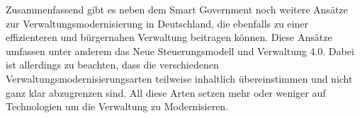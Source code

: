 Zusammenfassend gibt es neben dem Smart Government noch weitere Ansätze zur Verwaltungsmodernisierung in Deutschland, die ebenfalls zu einer effizienteren und bürgernahen Verwaltung beitragen können. 
Diese Ansätze umfassen unter anderem das Neue Steuerungsmodell und Verwaltung 4.0.
Dabei ist allerdings zu beachten, dass die verschiedenen Verwaltungsmodernisierungsarten teilweise inhaltlich übereinstimmen und nicht ganz klar abzugrenzen sind.
All diese Arten setzen mehr oder weniger auf Technologien um die Verwaltung zu Modernisieren.